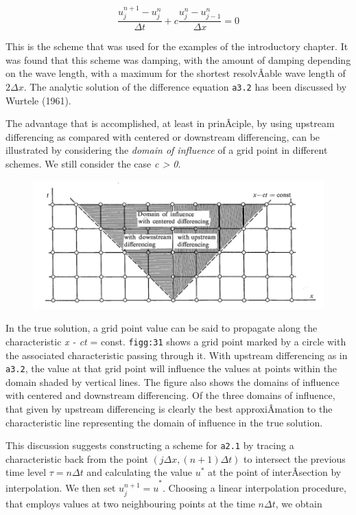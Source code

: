  {\[\frac{u_j^{n + 1} - u_j^{n}}{\Delta t}
+c \frac{u_j^{n} - u_{j - 1}^{n}}{\Delta x} = 0\]}

This is the scheme that was used for the examples of the introductory
chapter. It was found that this scheme was damping, with the amount of
damping depending on the wave length, with a maximum for the shortest
resolvÂ­able wave length of \(2\Delta x\). The analytic solution of the
difference equation \texttt{a3.2} has been discussed by Wurtele (1961).

The advantage that is accomplished, at least in prinÂ­ciple, by using
upstream differencing as compared with centered or downstream
differencing, can be illustrated by considering the \emph{domain of
influence} of a grid point in different schemes. We still consider the
case \emph{c \textgreater{} 0}.

\begin{figure}
 \centering
 \includegraphics[keepaspectratio]{figs/NM/pic31.jpg}
 \caption{} \label{fig:}
\end{figure}

In the true solution, a grid point value can be said to propagate along
the characteristic \emph{x - ct} = const. \texttt{figg:31} shows a grid
point marked by a circle with the associated characteristic passing
through it. With upstream differencing as in \texttt{a3.2}, the value at
that grid point will influence the values at points within the domain
shaded by vertical lines. The figure also shows the domains of influence
with centered and downstream differencing. Of the three domains of
influence, that given by upstream differencing is clearly the best
approxiÂ­mation to the characteristic line representing the domain of
influence in the true solution.

This discussion suggests constructing a scheme for \texttt{a2.1} by
tracing a characteristic back from the point
\(\left( j\Delta x,\left( n + 1 \right)\Delta t \right)\) to intersect
the previous time level \(\tau = n\Delta t\) and calculating the value
\(u^{*}\) at the point of interÂ­section by interpolation. We then set
\({u_{j}^{n + 1} = u}^{*}\). Choosing a linear interpolation procedure,
that employs values at two neighbouring points at the time
\(n\Delta t\), we obtain


